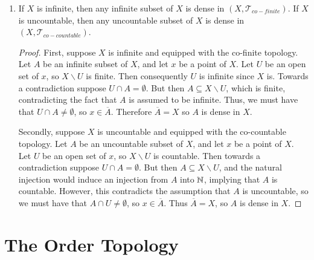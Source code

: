 \documentclass[12pt, a4paper, oneside, openright, titlepage]{book}
\begin{document}
\begin{example}
\begin{enumerate}
\begin{proof}
                Conversely, suppose $p \in A$. Then let $x$ be a point of $X$ and $U$ an open set containing $x$. Then by definition of open sets in the particular point topology, $p \in U$, so $p \in U \cap A \neq \emptyset$. Thus by definition $x \in \overline{A}$, so we conclude that $\overline{A} = X$.
        \end{proof}
        \item If $X$ is infinite, then any infinite subset of $X$ is dense in $(X,\mathcal{T}_{co-finite})$. If $X$ is uncountable, then any uncountable subset of $X$ is dense in $(X,\mathcal{T}_{co-countable})$.
            \begin{proof}
                First, suppose $X$ is infinite and equipped with the co-finite topology. Let $A$ be an infinite subset of $X$, and let $x$ be a point of $X$. Let $U$ be an open set of $x$, so $X\backslash U$ is finite. Then consequently $U$ is infinite since $X$ is. Towards a contradiction suppose $U\cap A = \emptyset$. But then $A \subseteq X\backslash U$, which is finite, contradicting the fact that $A$ is assumed to be infinite. Thus, we must have that $U\cap A \neq \emptyset$, so $x \in \overline{A}$. Therefore $\overline{A} = X$ so $A$ is dense in $X$.
                

                Secondly, suppose $X$ is uncountable and equipped with the co-countable topology. Let $A$ be an uncountable subset of $X$, and let $x$ be a point of $X$. Let $U$ be an open set of $x$, so $X\backslash U$ is countable. Then towards a contradiction suppose $U\cap A = \emptyset$. But then $A \subseteq X\backslash U$, and the natural injection would induce an injection from $A$ into $\mathbb N$, implying that $A$ is countable. However, this contradicts the assumption that $A$ is uncountable, so we must have that $A\cap U \neq \emptyset$, so $x \in \overline{A}$. Thus $\overline{A} = X$, so $A$ is dense in $X$.
            \end{proof}
    \end{enumerate}
\end{example}




\section{The Order Topology}
\end{document}

